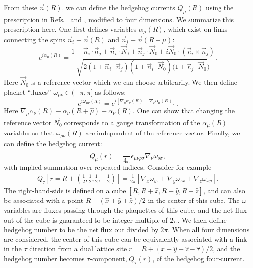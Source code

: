 \documentclass[prb,twocolumn]{revtex4-1}
\begin{document}
From these $\vec{n}(R)$, we can define the hedgehog currents $Q_\mu(R)$ using the prescription in Refs.~ and , modified to four dimensions. We summarize this prescription here. One first defines variables $\alpha_\mu(R)$, which exist on links connecting the spins $\vec{n}_i\equiv\vec n(R)$ and $\vec{n}_j\equiv\vec n(R+\mu)$:
\begin{equation}
e^{i\alpha_{\mu}(R)}=\frac{1+\vec{n}_i\cdot\vec{n}_j+\vec{n}_i\cdot\vec{N}_0+\vec{n}_j\cdot\vec{N}_0+i\vec{N}_0 \cdot(\vec{n}_i\times\vec{n}_j)}{\sqrt{2(1+\vec{n}_i\cdot\vec{n}_j)(1+\vec{n}_i\cdot\vec{N}_0)(1+\vec{n}_j\cdot\vec{N}_0})}.
\label{alpha}
\end{equation}
Here $\vec{N}_0$ is a reference vector which we can choose arbitrarily. 
We then define placket ``fluxes'' $\omega_{\mu\nu}\in (-\pi,\pi]$ as follows:
\begin{equation}
e^{i \omega_{\mu\nu}(R)} = 
e^{i [\nabla_\mu\alpha_\nu(R)-\nabla_\nu\alpha_\mu(R)]}.
\label{omega}
\end{equation}
Here $\nabla_\mu \alpha_\nu(R)\equiv \alpha_\nu(R+\hat{\mu})-\alpha_\nu(R)$. One can show that changing the reference vector $\vec{N}_0$ corresponds to a gauge transformation of the $\alpha_\mu(R)$ variables so that $\omega_{\mu\nu}(R)$ are independent of the reference vector. Finally, we can define the hedgehog current:
\begin{equation}
Q_\mu(r)=\frac{1}{4\pi}\epsilon_{\mu\nu\rho\sigma}\nabla_{\nu} \omega_{\rho\sigma},
\label{monopoledef}
\end{equation}
with implied summation over repeated indices.
Consider for example 
\begin{eqnarray}
Q_\tau[r=R+(\frac{1}{2},\frac{1}{2},\frac{1}{2},-\frac{1}{2})]=\frac{1}{2\pi}[\nabla_x\omega_{yz}+\nabla_y\omega_{zx}+\nabla_z\omega_{xy}]. 
\end{eqnarray}
The right-hand-side is defined on a cube $[R, R+\hat{x}, R+\hat{y}, R+\hat{z}]$, and can also be associated with a point $R + (\hat{x} + \hat{y} + \hat{z})/2$ in the center of this cube.
The $\omega$ variables are fluxes passing through the plaquettes of this cube, and the net flux out of the cube is guaranteed to be integer multiple of $2\pi$.  We then define hedgehog number to be the net flux out divided by $2\pi$.
When all four dimensions are considered, the center of this cube can be equivalently associated with a link in the $\tau$ direction from a dual lattice site $r = R + (\hat{x} + \hat{y} + \hat{z} - \hat{\tau})/2$, and the hedgehog number becomes $\tau$-component, $Q_\tau(r)$, of the hedgehog four-current.
\end{document}
